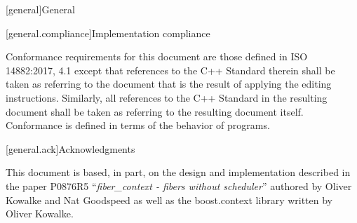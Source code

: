
[general]{General}


[general.compliance]{Implementation compliance}

\pnum
Conformance requirements for this document are those
defined in ISO 14882:2017, 4.1
except that references to the C++ Standard therein shall
be taken as referring to the document that is the result
of applying the editing instructions.  Similarly, all references
to the C++ Standard in the resulting document shall be taken
as referring to the resulting document itself.
\enternote
Conformance is defined in terms of the behavior of programs.
\exitnote

[general.ack]{Acknowledgments}

\pnum
This document is based, in part, on the design and implementation
described in the paper P0876R5 ``\emph{fiber_context - fibers without scheduler}''
authored by Oliver Kowalke and Nat Goodspeed as well as the boost.context
library written by Oliver Kowalke.
